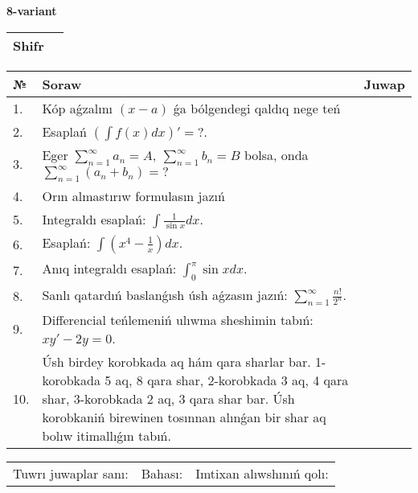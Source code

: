 \documentclass{article}
\begin{document}
  \egroup
  
  \newpage
  
  
  \textbf{8-variant}\\
  
  \bgroup
  \def\arraystretch{1.6} %
  
  \begin{tabular}{|m{5.7cm}|m{9.5cm}|}
  \hline
  Shifr & \\
  \hline
  \end{tabular}
  
  \vspace{1cm}
  
  \begin{tabular}{|m{0.7cm}|m{10cm}|m{4cm}|}
  \hline
  № & Soraw & Juwap \\
  \hline
  1. & Kóp aǵzalını \((x - a)\) ǵa bólgendegi qaldıq nege teń &  \\
  \hline
  2. & Esaplań \(\left( \int{f(x)dx} \right)' = ?\). &  \\
  \hline
  3. & Eger \(\sum_{n = 1}^{\infty}a_{n} = A,\ \sum_{n = 1}^{\infty}b_{n} = B\) bolsa, onda \(\sum_{n = 1}^{\infty}\left( a_{n} + b_{n} \right) = ?\) &  \\
  \hline
  4. & Orın almastırıw formulasın jazıń &  \\
  \hline
  5. & Integraldı esaplań: \(\int{\frac{1}{\sin x}dx}\). &  \\
  \hline
  6. & Esaplań: \(\int\left( x^{4} - \frac{1}{x} \right)dx\). &  \\
  \hline
  7. & Anıq integraldı esaplań: \(\int_{0}^{\pi}{\sin xdx}\). &  \\
  \hline
  8. & Sanlı qatardıń baslanǵısh úsh aǵzasın jazıń: \(\sum_{n = 1}^{\infty}\frac{n!}{2^{n}}\). &  \\
  \hline
  9. & Differencial teńlemeniń ulıwma sheshimin tabıń: \(xy' - 2y = 0\). &  \\
  \hline
  10. & Úsh birdey korobkada aq hám qara sharlar bar. 1-korobkada 5 aq, 8 qara shar, 2-korobkada 3 aq, 4 qara shar, 3-korobkada 2 aq, 3 qara shar bar. Úsh korobkaniń birewinen tosınnan alınǵan bir shar aq bolıw itimallıǵın tabıń. &  \\
  \hline
  \end{tabular}
  
  \vspace{1cm}
  
  \begin{tabular}{lll}
  Tuwrı juwaplar sanı: \underline{\hspace{1.5cm}} & 
  Bahası: \underline{\hspace{1.5cm}} & 
  Imtixan alıwshınıń qolı: \underline{\hspace{2cm}} \\
  \end{tabular}
  
\end{document}
